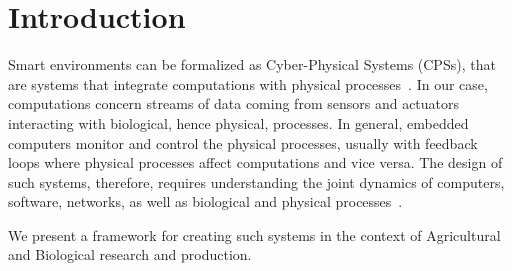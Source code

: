 \section{Introduction}\label{sec:introduction}

Smart environments can be formalized as Cyber-Physical Systems (CPSs), that are
systems that integrate computations with physical processes~\cite{alur2015principles, lee2016introduction}. In our case, computations concern streams of data coming from
sensors and actuators interacting with biological, hence physical, processes.
In general, embedded computers monitor and control the physical processes, usually with feedback loops where physical processes affect computations and vice versa. The design of such systems, therefore, requires understanding the joint dynamics of computers, software, networks, as well as biological and physical processes~\cite{derler2012modeling}.

We present a framework for creating such systems in the context of Agricultural and Biological research and production.



